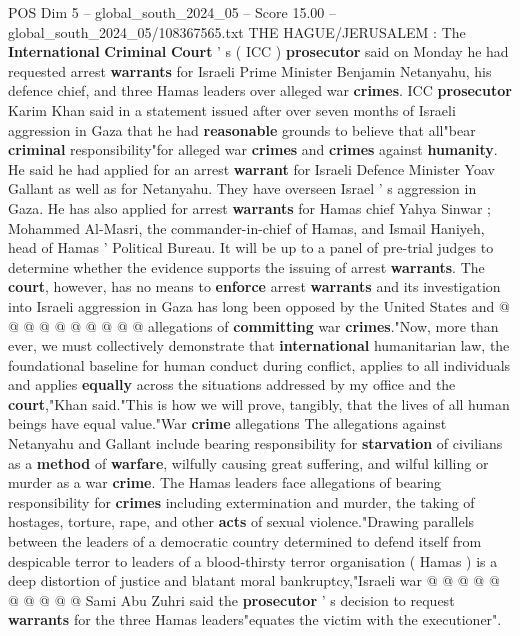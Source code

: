 \begin{textsample}{POS Dim 5 – global\_south\_2024\_05 – Score 15.00 – global\_south\_2024\_05/108367565.txt}  \label{ex:f5_pos_127}
THE HAGUE/JERUSALEM : The \textbf{International} \textbf{Criminal} \textbf{Court} ' s ( ICC ) \textbf{prosecutor} said on Monday he had requested arrest \textbf{warrants} for Israeli Prime Minister Benjamin Netanyahu, his defence chief, and three Hamas leaders over alleged war \textbf{crimes}.
ICC \textbf{prosecutor} Karim Khan said in a statement issued after over seven months of Israeli aggression in Gaza that he had \textbf{reasonable} grounds to believe that all"bear \textbf{criminal} responsibility"for alleged war \textbf{crimes} and \textbf{crimes} against \textbf{humanity}.
He said he had applied for an arrest \textbf{warrant} for Israeli Defence Minister Yoav Gallant as well as for Netanyahu.
They have overseen Israel ' s aggression in Gaza.
He has also applied for arrest \textbf{warrants} for Hamas chief Yahya Sinwar ; Mohammed Al-Masri, the commander-in-chief of Hamas, and Ismail Haniyeh, head of Hamas ' Political Bureau.
It will be up to a panel of pre-trial judges to determine whether the evidence supports the issuing of arrest \textbf{warrants}.
The \textbf{court}, however, has no means to \textbf{enforce} arrest \textbf{warrants} and its investigation into Israeli aggression in Gaza has long been opposed by the United States and @ @ @ @ @ @ @ @ @ @ allegations of \textbf{committing} war \textbf{crimes}."Now, more than ever, we must collectively demonstrate that \textbf{international} humanitarian law, the foundational baseline for human conduct during conflict, applies to all individuals and applies \textbf{equally} across the situations addressed by my office and the \textbf{court},"Khan said."This is how we will prove, tangibly, that the lives of all human beings have equal value."War \textbf{crime} allegations The allegations against Netanyahu and Gallant include bearing responsibility for \textbf{starvation} of civilians as a \textbf{method} of \textbf{warfare}, wilfully causing great suffering, and wilful killing or murder as a war \textbf{crime}.
The Hamas leaders face allegations of bearing responsibility for \textbf{crimes} including extermination and murder, the taking of hostages, torture, rape, and other \textbf{acts} of sexual violence."Drawing parallels between the leaders of a democratic country determined to defend itself from despicable terror to leaders of a blood-thirsty terror organisation ( Hamas ) is a deep distortion of justice and blatant moral bankruptcy,"Israeli war @ @ @ @ @ @ @ @ @ @ Sami Abu Zuhri said the \textbf{prosecutor} ' s decision to request \textbf{warrants} for the three Hamas leaders"equates the victim with the executioner".

\end{textsample}
